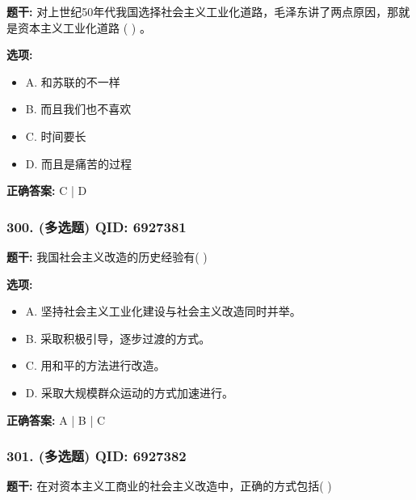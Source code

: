 \documentclass[12pt,UTF8]{ctexart}
\begin{document}
\textbf{题干:}
对上世纪50年代我国选择社会主义工业化道路，毛泽东讲了两点原因，那就是资本主义工业化道路 ( ) 。

\textbf{选项:}
\begin{itemize}[leftmargin=*]

  \item A. 和苏联的不一样

  \item B. 而且我们也不喜欢

  \item C. 时间要长

  \item D. 而且是痛苦的过程

\end{itemize}

\textbf{正确答案:}
C | D

\vspace{0.3em}\hrulefill\vspace{0.7em}

\subsubsection*{300. (多选题) \small QID: 6927381}

\textbf{题干:}
我国社会主义改造的历史经验有(      )

\textbf{选项:}
\begin{itemize}[leftmargin=*]

  \item A. 坚持社会主义工业化建设与社会主义改造同时并举。

  \item B. 采取积极引导，逐步过渡的方式。

  \item C. 用和平的方法进行改造。

  \item D. 采取大规模群众运动的方式加速进行。

\end{itemize}

\textbf{正确答案:}
A | B | C

\vspace{0.3em}\hrulefill\vspace{0.7em}

\subsubsection*{301. (多选题) \small QID: 6927382}

\textbf{题干:}
在对资本主义工商业的社会主义改造中，正确的方式包括(      )
\end{document}
